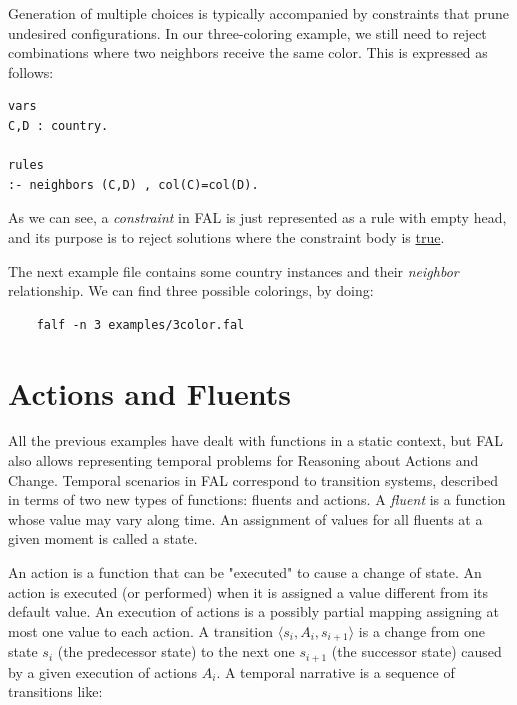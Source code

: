 \documentclass[a4paper,12pt]{report}
\begin{document}
Generation of multiple choices is typically accompanied by {\color{orange}constraints} that prune undesired configurations. In our three-coloring example, we still need to reject combinations where two neighbors receive the same color. This is expressed as follows:

\begin{verbatim}
vars
C,D : country.

rules
:- neighbors (C,D) , col(C)=col(D).
\end{verbatim}

As we can see, a \textit{constraint} in FAL is just represented as a rule with empty head, and its purpose is to reject solutions where the constraint body is \underline{true}.
\vspace{0.5 cm}
\begin{mdframed}[backgroundcolor=blue!20]
The next example file contains some country instances and their \textit{neighbor} relationship. 
We can find three possible colorings, by doing:

\begin{verbatim}
	falf -n 3 examples/3color.fal
\end{verbatim}
\end{mdframed}
\vspace{0.5 cm}

\section{Actions and Fluents}

All the previous examples have dealt with functions in a {\color{orange}static} context, but FAL also allows representing {\color{orange}temporal} problems for Reasoning about Actions and Change. Temporal scenarios in FAL correspond to {\color{orange}transition systems}, described in terms of two new types of functions: {\color{orange}fluents} and {\color{orange}actions}. A {\color{orange} \textit{fluent}} is a function whose value may vary along time. An assignment of values for all fluents at a given moment is called a {\color{orange}state}. 

An {\color{orange}action} is a function that can be "executed" to cause a change of state. An action is {\color{orange}executed }(or performed) when it is assigned a value different from its default value. An {\color{orange}execution of actions} is a possibly partial mapping assigning at most one value to each action. A {\color{orange}transition} $\langle s_i,A_i,s_{i+1}\rangle$ is a change from one state $s_i$ (the predecessor state) to the next one $s_{i+1}$ (the successor state) caused by a given execution of actions $A_i$. A temporal {\color{orange}narrative} is a sequence of transitions like:
\end{document}
